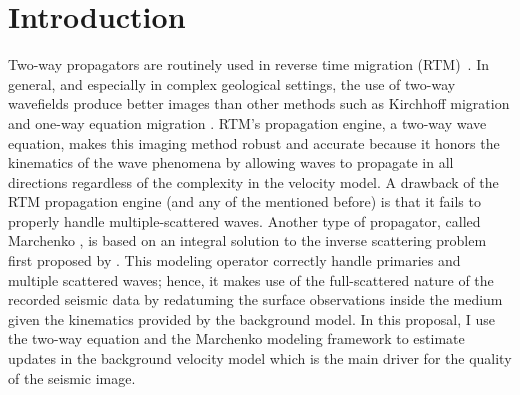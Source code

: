 \section{Introduction}
% 
%
%
 Two-way propagators are routinely used in reverse time migration (RTM)~\citep{baysal:1514, whitmore:382, GPR:GPR413}.
 In general, and especially in complex geological settings, the use of two-way wavefields
produce better images than other methods such as Kirchhoff migration \citep{Schneider,Blestein87} and one-way equation
 migration \citep{gazdag:1342,gazdag:124}. RTM's propagation engine, a two-way wave equation, 
makes this imaging method robust and accurate because it honors the kinematics of 
the wave phenomena by allowing waves to propagate in all directions regardless of
 the complexity in the  velocity model. A drawback of the RTM propagation 
engine (and any of the mentioned before)
is that it fails to properly handle multiple-scattered waves. Another type of propagator, called
Marchenko \citep{Fil2012,Behura,Wapenaar,Singh2015}, is 
based on an integral solution to the inverse scattering problem first proposed by
\cite{rose2002,rose2002single}.  This modeling operator correctly handle 
primaries and multiple scattered waves; hence, it makes use of the full-scattered nature 
of the recorded seismic data by redatuming the surface observations inside the medium
given the kinematics provided by the background model. In this proposal, I use the two-way equation and the Marchenko
modeling framework to estimate updates in the background velocity model which is the main 
driver for the quality of the seismic image. 
%
%
%
